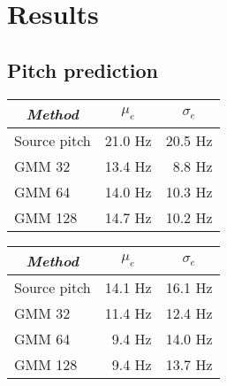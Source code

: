 \chapter{Results} %
\label{cha:results}

\section{Pitch prediction} %
\label{sec:pitch_prediction}

\begin{table}[ht]
	\begin{center}
		\begin{tabular}{lrr}
			\toprule
			\multicolumn{1}{c}{\emph{Method}} & \multicolumn{1}{c}{$\mu_e$} & \multicolumn{1}{c}{$\sigma_e$}\\
			\midrule
			Source pitch & 21.0 Hz & 20.5 Hz\\
			GMM 32 & 13.4 Hz & 8.8 Hz\\
			GMM 64 & 14.0 Hz & 10.3 Hz\\
			GMM 128 & 14.7 Hz &  10.2 Hz\\
			\bottomrule			
		\end{tabular}		
	\end{center}
\label{tab:pitch_prediction_baseline}	
\end{table}

\begin{table}[ht]
	\begin{center}
		\begin{tabular}{lrr}
			\toprule
			\multicolumn{1}{c}{\emph{Method}} & \multicolumn{1}{c}{$\mu_e$} & \multicolumn{1}{c}{$\sigma_e$}\\
			\midrule
			Source pitch & 14.1 Hz & 16.1 Hz\\
			GMM 32 & 11.4 Hz  & 12.4 Hz\\
			GMM 64 & 9.4 Hz  & 14.0 Hz\\
			GMM 128 & 9.4 Hz & 13.7 Hz\\
			\bottomrule			
		\end{tabular}		
	\end{center}
\label{tab:pitch_prediction_transformed}	
\end{table}
